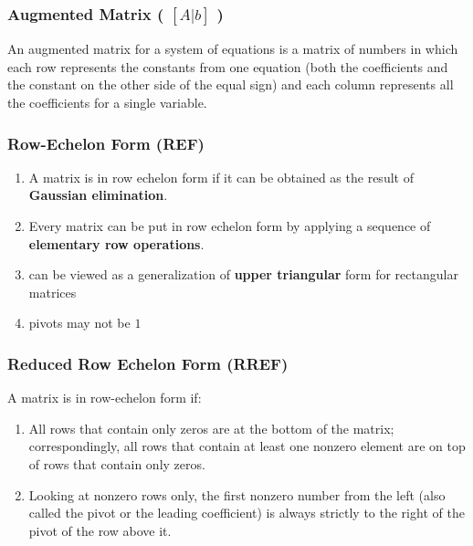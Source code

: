 \subsubsection{Augmented Matrix ( $[A|b]$ ) \cite{mfml-1}} \label{Augmented Matrix}

An augmented matrix for a system of equations is a matrix of numbers in which each row represents the constants from one equation (both the coefficients and the constant on the other side of the equal sign) and each column represents all the coefficients for a single variable.


\subsubsection{Row-Echelon Form (REF) \cite{mfml-1,wiki/Row_echelon_form}}\label{Row-Echelon Form (REF)}

\begin{enumerate}
    \item A matrix is in row echelon form if it can be obtained as the result of \textbf{Gaussian elimination}.

    \item Every matrix can be put in row echelon form by applying a sequence of \textbf{elementary row operations}.

    \item can be viewed as a generalization of \textbf{upper triangular} form for rectangular matrices

    \item pivots may not be $1$
\end{enumerate}


\subsubsection{Reduced Row Echelon Form (RREF) \cite{mfml-1,wiki/Row_echelon_form}}\label{Reduced Row Echelon Form (RREF)}
A matrix is in row-echelon form if:
\begin{enumerate}
    \item All rows that contain only zeros are at the bottom of the matrix; correspondingly, all rows that contain at least one nonzero element are on top of rows that contain only zeros.

    \item Looking at nonzero rows only, the first nonzero number from the left (also called the pivot or the leading coefficient) is always strictly to the right of the pivot of the row above it.
\end{enumerate}

